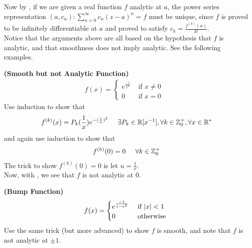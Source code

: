 \documentclass{report}
\begin{document}
\begin{mdframed}
Now by , if we are given a real function $f$ analytic at $a$, the power series representation $(a,c_n):\sum_{n=0}^\infty c_n(z-a)^n=f$ must be unique, since $f$ is proved to be infinitely differentiable at $a$ and proved to satisfy $c_k=\frac{f^{(k)}(a)}{k!}$.\\

Notice that the arguments above are all based on the hypothesis that $f$ is analytic, and that smoothness does not imply analytic. See the following examples.
\end{mdframed}
\begin{mdframed}
\begin{Example}{\textbf{(Smooth but not Analytic Function)}}{}
\begin{align*}
f(x)=\begin{cases}
  e^{\frac{-1}{x^2}}& \text{ if $x\neq 0$ }\\
  0& \text{ if $x=0$ }
\end{cases}
\end{align*}
Use induction to show that 
\begin{align*}
f^{(k)}(x)=P_k(\frac{1}{x})e^{-(\frac{1}{x})^2}\hspace{0.5cm}\exists P_k\in\mathbb{R}[x^{-1}],\forall k\in\mathbb{Z}^+_0,\forall x\in\mathbb{R}^*
\end{align*}
and again use induction to show that  
\begin{align*}
f^{(k)}(0)=0\hspace{0.5cm}\forall k\in\mathbb{Z}_0^+
\end{align*}
The trick to show $f^{(k)}(0)=0$ is let $u=\frac{1}{x}$.\\

Now, with , we see that $f$ is not analytic at $0$. 
\end{Example}
\begin{Example}{\textbf{(Bump Function)}}{}
\begin{align*}
f(x)=\begin{cases}
  e^{\frac{-1}{1-x^2}}& \text{ if $\left|x\right|<1$ }\\
  0& \text{ otherwise }
\end{cases}
\end{align*}
Use the same trick (but more advanced) to show $f$ is smooth, and note that $f$ is not analytic at $\pm 1$. 
\end{Example}
\end{mdframed}
\end{document}
